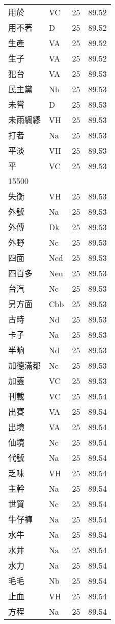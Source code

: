 \documentclass[twocolumn]{book}
\begin{document}
\begin{supertabular}{llrr}
用於 & VC & 25 &  89.52\\
用不著 & D & 25 &  89.52\\
生產 & VA & 25 &  89.52\\
生子 & VA & 25 &  89.52\\
犯台 & VA & 25 &  89.53\\
民主黨 & Nb & 25 &  89.53\\
未嘗 & D & 25 &  89.53\\
未雨綢繆 & VH & 25 &  89.53\\
打者 & Na & 25 &  89.53\\
平淡 & VH & 25 &  89.53\\
平 & VC & 25 &  89.53\\
15500\\
失衡 & VH & 25 &  89.53\\
外號 & Na & 25 &  89.53\\
外傳 & Dk & 25 &  89.53\\
外野 & Nc & 25 &  89.53\\
四面 & Ncd & 25 &  89.53\\
四百多 & Neu & 25 &  89.53\\
台汽 & Nc & 25 &  89.53\\
另方面 & Cbb & 25 &  89.53\\
古時 & Nd & 25 &  89.53\\
卡子 & Na & 25 &  89.53\\
半晌 & Nd & 25 &  89.53\\
加德滿都 & Nc & 25 &  89.53\\
加蓋 & VC & 25 &  89.53\\
刊載 & VC & 25 &  89.54\\
出賽 & VA & 25 &  89.54\\
出境 & VA & 25 &  89.54\\
仙境 & Nc & 25 &  89.54\\
代號 & Na & 25 &  89.54\\
乏味 & VH & 25 &  89.54\\
主幹 & Na & 25 &  89.54\\
世貿 & Nc & 25 &  89.54\\
牛仔褲 & Na & 25 &  89.54\\
水牛 & Na & 25 &  89.54\\
水井 & Na & 25 &  89.54\\
水力 & Na & 25 &  89.54\\
毛毛 & Nb & 25 &  89.54\\
止血 & VH & 25 &  89.54\\
方程 & Na & 25 &  89.54\\

\end{supertabular}
\end{document}

